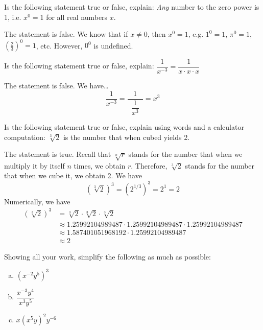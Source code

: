 \documentclass[11pt,letterpaper]{article}
\begin{document}

 Is the following statement true or false, explain: \textit{Any} number to the zero power is 1, i.e. $x^0= 1$ for all real numbers $x$. \pspace

\sol The statement is false. We know that if $x \neq 0$, then $x^0= 1$, e.g. $1^0= 1$, $\pi^0= 1$, $(\frac{2}{3})^0= 1$, etc. However, $0^0$ is undefined. 



\newpage



 Is the following statement true or false, explain: $\dfrac{1}{x^{-3}}= \dfrac{1}{x \cdot x \cdot x}$ \pspace

\sol The statement is false. We have\dots
	\[
	\dfrac{1}{x^{-3}}= \dfrac{\;\;\;1\;\;\;}{\dfrac{1}{x^3}}= x^3
	\]



\newpage



 Is the following statement true or false, explain using words and a calculator computation: $\sqrt[3]{2}$ is the number that when cubed yields 2. \pspace

\sol The statement is true. Recall that $\sqrt[n]{r}$ stands for the number that when we multiply it by itself $n$ times, we obtain $r$. Therefore, $\sqrt[3]{2}$ stands for the number that when we cube it, we obtain 2. We have
	\[
	(\sqrt[3]{2})^3= (2^{1/3})^3= 2^1= 2
	\]
Numerically, we have
	\[
	\begin{aligned}
	(\sqrt[3]{2})^3&= \sqrt[3]{2} \cdot \sqrt[3]{2} \cdot \sqrt[3]{2} \\
	&\approx 1.25992104989487 \cdot 1.25992104989487 \cdot 1.25992104989487 \\
	&\approx 1.587401051968192 \cdot 1.25992104989487 \\
	&\approx 2
	\end{aligned}
	\]



\newpage



 Showing all your work, simplify the following as much as possible:
        \begin{enumerate}[(a)]
        \item $(x^{-2} y^5)^3$
        \item $\dfrac{x^{-3}y^4}{x^3y^5}$
        \item $x(x^5y)^2y^{-6}$
        \end{enumerate} \pspace
\end{document}
